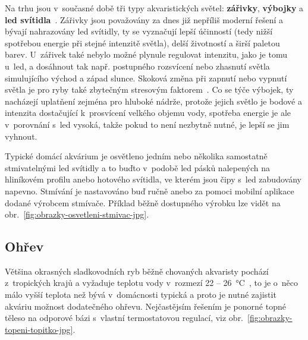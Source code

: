         Na trhu jsou v~současné době tři typy akvaristických světel: \textbf{zářivky}, \textbf{výbojky}  a \textbf{\acs{led} svítidla}~\cite{eshop-rostlinna-akvaria-svetlo}. Zářivky jsou považovány za dnes již nepříliš moderní řešení a bývají nahrazovány \acs{led} svítidly, ty se vyznačují lepší účinností (tedy nižší spotřebou energie při stejné intenzitě světla), delší životností a širší paletou barev. U~zářivek také nebylo možné plynule regulovat intenzitu, jako je tomu u~\acs{led}, a dosáhnout tak např. postupného rozsvícení nebo zhasnutí světla simulujícího východ a západ slunce. Skoková změna při zapnutí nebo vypnutí světla je pro ryby také zbytečným stresovým faktorem~\cite{MusilLibor2018Isps}. Co se týče výbojek, ty nacházejí uplatňení zejména pro hluboké nádrže, protože jejich světlo je bodové a intenzita dostačující k~prosvícení velkého objemu vody, spotřeba energie je ale v~porovnání s~\acs{led} vysoká, takže pokud to není nezbytně nutné, je lepší se jim vyhnout.   

        Typické domácí akvárium je osvětleno jedním nebo několika samostatně stmivatelnými \acs{led} svítidly a to buďto v~podobě \acs{led} pásků nalepených na hliníkovém profilu anebo hotového svítidla, ve kterém jsou čipy s~\acs{led} zabudovány napevno. Stmívání je nastavováno buď ručně anebo za pomoci mobilní aplikace dodané výrobcem stmívače. Příklad běžně dostupného výrobku lze vidět na obr.~\ref{fig:obrazky-osvetleni-stmivac-jpg}.

    \subsection{Ohřev}
        Většina okrasných sladkovodních ryb běžně chovaných akvaristy pochází z~tropických krajů a vyžaduje teplotu vody v~rozmezí 22 -- \qty{26}{\degreeCelsius}~\cite{slavotinek2014}, to je o~něco málo vyšší teplota než bývá v~domácnosti typická a proto je nutné zajistit akváriu možnost dodatečného ohřevu. Nejčastějsím řešením je ponorné topné těleso na odporové bázi s~vlastní termostatovou regulací, viz obr.~\ref{fig:obrazky-topeni-topitko-jpg}.

